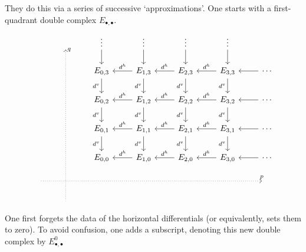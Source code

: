 \documentclass[main.tex]{subfiles}
\begin{document}
They do this via a series of successive `approximations'. One starts with a first-quadrant double complex $E_{\bullet,\bullet}$.
\begin{equation*}
  \begin{tikzcd}
    & \
    \arrow[dddddd, leftarrow, dotted, at start, "q"]
    & \vdots
    \arrow[d]
    & \vdots
    \arrow[d]
    & \vdots
    \arrow[d]
    & \vdots
    \arrow[d]
    \\
    && E_{0,3}
    \arrow[d, swap, "d^{v}"]
    & E_{1,3}
    \arrow[l, swap, "d^{h}"]
    \arrow[d, swap, "d^{v}"]
    & E_{2,3}
    \arrow[l, swap, "d^{h}"]
    \arrow[d, swap, "d^{v}"]
    & E_{3,3}
    \arrow[l, swap, "d^{h}"]
    \arrow[d, swap, "d^{v}"]
    & \cdots
    \arrow[l]
    \\
    && E_{0,2}
    \arrow[d, swap, "d^{v}"]
    & E_{1,2}
    \arrow[l, swap, "d^{h}"]
    \arrow[d, swap, "d^{v}"]
    & E_{2,2}
    \arrow[l, swap, "d^{h}"]
    \arrow[d, swap, "d^{v}"]
    & E_{3,2}
    \arrow[l, swap, "d^{h}"]
    \arrow[d, swap, "d^{v}"]
    & \cdots
    \arrow[l]
    \\
    && E_{0,1}
    \arrow[d, swap, "d^{v}"]
    & E_{1,1}
    \arrow[l, swap, "d^{h}"]
    \arrow[d, swap, "d^{v}"]
    & E_{2,1}
    \arrow[l, swap, "d^{h}"]
    \arrow[d, swap, "d^{v}"]
    & E_{3,1}
    \arrow[l, swap, "d^{h}"]
    \arrow[d, swap, "d^{v}"]
    & \cdots
    \arrow[l]
    \\
    && E_{0,0}
    & E_{1,0}
    \arrow[l, swap, "d^{h}"]
    & E_{2,0}
    \arrow[l, swap, "d^{h}"]
    & E_{3,0}
    \arrow[l, swap, "d^{h}"]
    & \cdots
    \arrow[l]
    \\
    \
    \arrow[rrrrrr, dotted, at end, "p"]
    &&&&&& \
    \\
    & \
  \end{tikzcd}
\end{equation*}
One first forgets the data of the horizontal differentials (or equivalently, sets them to zero). To avoid confusion, one adds a subscript, denoting this new double complex by $E^{0}_{\bullet,\bullet}$
\end{document}
